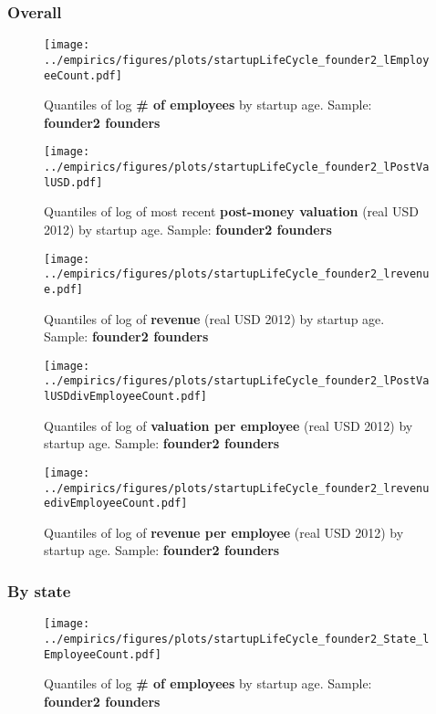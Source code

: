 \documentclass[12pt,english]{article}
\theoremstyle{remark}
\let\Oldsubsubsection\subsubsection
\renewcommand{\subsubsection}{\FloatBarrier\Oldsubsubsection}
\begin{document}
\subsubsection{Overall}

\begin{figure}[!htb]
	\centering
	\texttt{[image: ../empirics/figures/plots/startupLifeCycle\_founder2\_lEmployeeCount.pdf]}
	\caption{Quantiles of log \textbf{\# of employees} by startup age. 
		Sample: \textbf{founder2 founders}}
\end{figure}

\begin{figure}[!htb]
	\centering
	\texttt{[image: ../empirics/figures/plots/startupLifeCycle\_founder2\_lPostValUSD.pdf]}
	\caption{Quantiles of log of most recent \textbf{post-money valuation} (real USD 2012) by startup age. 
		Sample: \textbf{founder2 founders}}
\end{figure}

\begin{figure}[!htb]
	\centering
	\texttt{[image: ../empirics/figures/plots/startupLifeCycle\_founder2\_lrevenue.pdf]}
	\caption{Quantiles of log of \textbf{revenue} (real USD 2012) by startup age. 
		Sample: \textbf{founder2 founders}}
\end{figure}

\begin{figure}[!htb]
	\centering
	\texttt{[image: ../empirics/figures/plots/startupLifeCycle\_founder2\_lPostValUSDdivEmployeeCount.pdf]}
	\caption{Quantiles of log of \textbf{valuation per employee} (real USD 2012) by startup age. 
		Sample: \textbf{founder2 founders}}
\end{figure}

\begin{figure}[!htb]
	\centering
	\texttt{[image: ../empirics/figures/plots/startupLifeCycle\_founder2\_lrevenuedivEmployeeCount.pdf]}
	\caption{Quantiles of log of \textbf{revenue per employee} (real USD 2012) by startup age. 
		Sample: \textbf{founder2 founders}}
\end{figure}

\subsubsection{By state}

\begin{figure}[!htb]
	\centering
	\texttt{[image: ../empirics/figures/plots/startupLifeCycle\_founder2\_State\_lEmployeeCount.pdf]}
	\caption{Quantiles of log \textbf{\# of employees} by startup age. 
		Sample: \textbf{founder2 founders}}
\end{figure}
\end{document}
